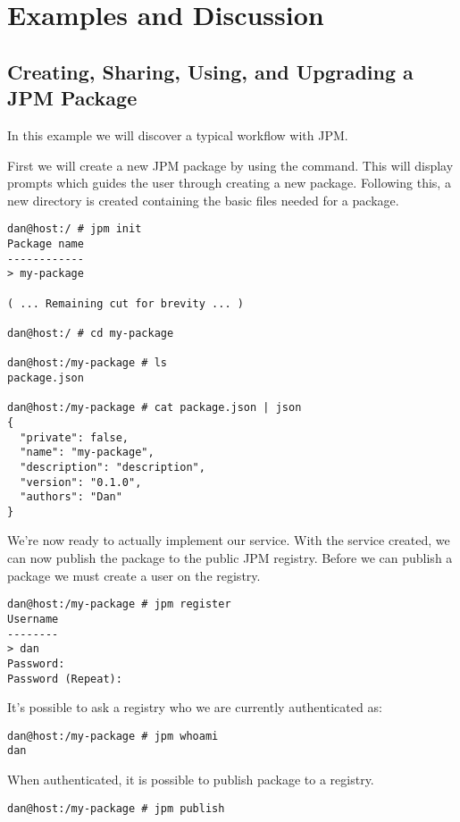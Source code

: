 \section{Examples and Discussion}
\label{sec:package_manager_examples}

\subsection{Creating, Sharing, Using, and Upgrading a JPM Package}
\label{sec:jpm_basic_example}

In this example we will discover a typical workflow with JPM.

First we will create a new JPM package by using the  command.
This will display prompts which guides the user through creating a new package.
Following this, a new directory is created containing the basic files needed for
a package.

\begin{verbatim}
dan@host:/ # jpm init
Package name
------------
> my-package

( ... Remaining cut for brevity ... )

dan@host:/ # cd my-package

dan@host:/my-package # ls
package.json

dan@host:/my-package # cat package.json | json
{
  "private": false,
  "name": "my-package",
  "description": "description",
  "version": "0.1.0",
  "authors": "Dan"
}
\end{verbatim}

We're now ready to actually implement our service. With the service created, we
can now publish the package to the public JPM registry. Before we can publish a
package we must create a user on the registry.

\begin{verbatim}
dan@host:/my-package # jpm register
Username
--------
> dan
Password:
Password (Repeat):
\end{verbatim}

It's possible to ask a registry who we are currently authenticated as:

\begin{verbatim}
dan@host:/my-package # jpm whoami
dan
\end{verbatim}

When authenticated, it is possible to publish package to a registry.

\begin{verbatim}
dan@host:/my-package # jpm publish
\end{verbatim}

